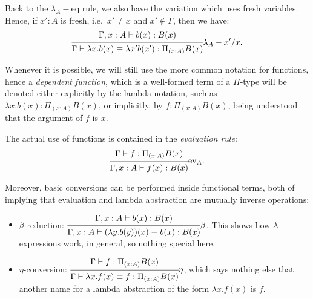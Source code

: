 Back to the $ \lambda_A-\text{eq} $ rule, we also have the variation
which uses fresh variables. Hence, if $ x' : A $ is fresh, i.e.\
$ x' \neq x $ and $ x' \notin \Gamma $, then we have:
\[
  \begin{prooftree}
    \hypo{\Gamma, x : A \vdash b(x) : B(x)}
    \infer1{\Gamma \vdash \lambda x . b(x) \equiv \lambda x' b(x') : %
      \Pi_{(x : A)} B(x)}
  \end{prooftree}\lambda_A-x'/x.
\]

Whenever it is possible, we will still use the more common notation
for functions, hence a \emph{dependent function}, which is a well-formed
term of a $ \Pi $-type will be denoted either explicitly by the
lambda notation, such as $ \lambda x . b(x) : \Pi_{(x : A)} B(x) $,
or implicitly, by $ f : \Pi_{(x : A)} B(x) $, being understood that
the argument of $ f $ is $ x $.

The actual use of functions is contained in the \emph{evaluation rule}:
\[
  \begin{prooftree}
    \hypo{\Gamma \vdash f : \Pi_{(x : A)} B(x)}
    \infer1{\Gamma, x : A \vdash f(x) : B(x)}
  \end{prooftree}\dr{ev}_A.
\]

Moreover, basic conversions can be performed inside functional terms,
both of implying that evaluation and lambda abstraction are mutually
inverse operations:
\begin{itemize}
\item $ \beta $-reduction:
  $ \begin{prooftree}
    \hypo{\Gamma, x : A \vdash b(x) : B(x)}
    \infer1{\Gamma, x : A \vdash (\lambda y . b(y))(x) \equiv b(x) : B(x)}
  \end{prooftree}\beta
  $. This shows how $ \lambda $ expressions work, in general,
  so nothing special here.
\item $ \eta $-conversion:
  $ \begin{prooftree}
    \hypo{\Gamma \vdash f : \Pi_{(x : A)} B(x)}
    \infer1{\Gamma \vdash \lambda x . f(x) \equiv f : \Pi_{(x:A)} B(x)}
  \end{prooftree}\eta
  $, which says nothing else that another name for a lambda abstraction
  of the form $ \lambda x . f(x) $ is $ f $.
\end{itemize}

